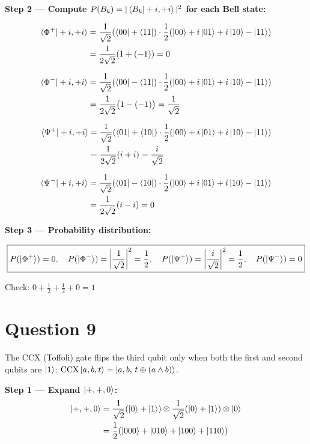 \documentclass[12pt,a4paper]{article}
\begin{document}
\textbf{Step 2 --- Compute $P(B_k)=|\braket{B_k|+i,+i}|^2$ for each Bell state:}

\begin{align*}
\braket{\Phi^+|+i,+i}
  &= \frac{1}{\sqrt{2}}(\bra{00}+\bra{11})
     \cdot\frac{1}{2}(\ket{00}+i\ket{01}+i\ket{10}-\ket{11}) \\
  &= \frac{1}{2\sqrt{2}}(1+(-1)) = 0
\end{align*}

\begin{align*}
\braket{\Phi^-|+i,+i}
  &= \frac{1}{\sqrt{2}}(\bra{00}-\bra{11})
     \cdot\frac{1}{2}(\ket{00}+i\ket{01}+i\ket{10}-\ket{11}) \\
  &= \frac{1}{2\sqrt{2}}\bigl(1-(-1)\bigr) = \frac{1}{\sqrt{2}}
\end{align*}

\begin{align*}
\braket{\Psi^+|+i,+i}
  &= \frac{1}{\sqrt{2}}(\bra{01}+\bra{10})
     \cdot\frac{1}{2}(\ket{00}+i\ket{01}+i\ket{10}-\ket{11}) \\
  &= \frac{1}{2\sqrt{2}}(i+i) = \frac{i}{\sqrt{2}}
\end{align*}

\begin{align*}
\braket{\Psi^-|+i,+i}
  &= \frac{1}{\sqrt{2}}(\bra{01}-\bra{10})
     \cdot\frac{1}{2}(\ket{00}+i\ket{01}+i\ket{10}-\ket{11}) \\
  &= \frac{1}{2\sqrt{2}}(i-i) = 0
\end{align*}

\textbf{Step 3 --- Probability distribution:}

\[
  \boxed{
    P(\ket{\Phi^+})=0,\quad
    P(\ket{\Phi^-})=\left|\frac{1}{\sqrt{2}}\right|^2=\frac{1}{2},\quad
    P(\ket{\Psi^+})=\left|\frac{i}{\sqrt{2}}\right|^2=\frac{1}{2},\quad
    P(\ket{\Psi^-})=0
  }
\]

Check: $0+\tfrac{1}{2}+\tfrac{1}{2}+0=1$ \checkmark

\section*{Question 9}

The CCX (Toffoli) gate flips the third qubit only when both the first and second
qubits are $\ket{1}$: $\mathrm{CCX}\ket{a,b,t}=\ket{a,b,\,t\oplus(a\wedge b)}$.

\medskip
\textbf{Step 1 --- Expand $\ket{+,+,0}$:}
\begin{align*}
\ket{+,+,0}
  &= \frac{1}{\sqrt{2}}(\ket{0}+\ket{1})\otimes\frac{1}{\sqrt{2}}(\ket{0}+\ket{1})\otimes\ket{0} \\
  &= \frac{1}{2}(\ket{000}+\ket{010}+\ket{100}+\ket{110})
\end{align*}
\end{document}
